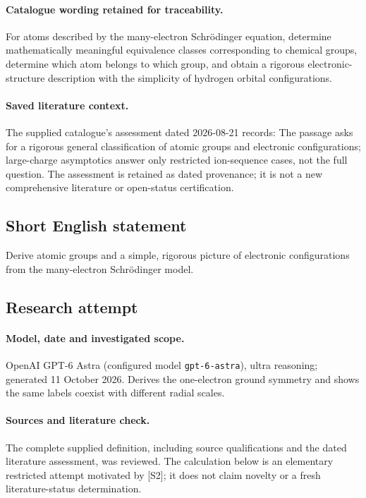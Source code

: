 \documentclass[11pt]{article}
\begin{document}
\paragraph{Catalogue wording retained for traceability.}
For atoms described by the many-electron Schrödinger equation, determine mathematically meaningful equivalence classes corresponding to chemical groups, determine which atom belongs to which group, and obtain a rigorous electronic-structure description with the simplicity of hydrogen orbital configurations.

\paragraph{Saved literature context.} The supplied catalogue's assessment dated 2026-08-21 records: The passage asks for a rigorous general classification of atomic groups and electronic configurations; large-charge asymptotics answer only restricted ion-sequence cases, not the full question. The assessment is retained as dated provenance; it is not a new comprehensive literature or open-status certification.
\subsection{Short English statement}
Derive atomic groups and a simple, rigorous picture of electronic configurations from the many-electron Schrödinger model.
\subsection{Research attempt}
\paragraph{Model, date and investigated scope.}
OpenAI GPT-6 Astra (configured model \texttt{gpt-6-astra}), ultra reasoning; generated 11 October 2026. Derives the one-electron ground symmetry and shows the same labels coexist with different radial scales.

\paragraph{Sources and literature check.}
The complete supplied definition, including source qualifications and the dated literature assessment, was reviewed. The calculation below is an elementary restricted attempt motivated by [S2]; it does not claim novelty or a fresh literature-status determination.
\end{document}
